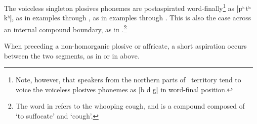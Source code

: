 The voiceless singleton plosives phonemes are postaspirated word-finally\footnote{Note, however, that speakers from the northern parts of \PS\ territory tend to voice the voiceless plosives phonemes as [b d g] in word-final position.} 
as [pʰ\,tʰ\,kʰ], as in examples  through , as in examples  through . This is also the case across an internal compound boundary, as in .\footnote{The word  in  refers to the whooping cough, and is a compound composed of  ‘to suffocate’ and  ‘cough’.}

When preceding a non-homorganic plosive or affricate, a short aspiration occurs between the two segments, as in  or in  above. 

